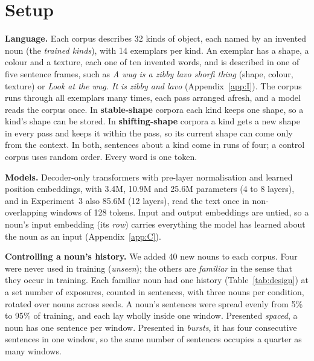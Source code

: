\documentclass[11pt]{article}
\begin{document}
\section{Setup}\label{sec:setup}\label{sec:background}
\textbf{Language.} Each corpus describes 32 kinds of object, each named by an invented noun (the \emph{trained kinds}), with 14 exemplars per kind. An exemplar has a shape, a colour and a texture, each one of ten invented words, and is described in one of five sentence frames, such as \emph{A wug is a zibby lavo shorfi thing} (shape, colour, texture) or \emph{Look at the wug. It is zibby and lavo} (Appendix~\ref{app:I}). The corpus runs through all exemplars many times, each pass arranged afresh, and a model reads the corpus once. In \textbf{stable-shape} corpora each kind keeps one shape, so a kind's shape can be stored. In \textbf{shifting-shape} corpora a kind gets a new shape in every pass and keeps it within the pass, so its current shape can come only from the context. In both, sentences about a kind come in runs of four; a control corpus uses random order. Every word is one token.

\textbf{Models.} Decoder-only transformers with pre-layer normalisation and learned position embeddings, with 3.4M, 10.9M and 25.6M parameters (4 to 8 layers), and in Experiment~3 also 85.6M (12 layers), read the text once in non-overlapping windows of 128 tokens. Input and output embeddings are untied, so a noun's input embedding (its \emph{row}) carries everything the model has learned about the noun as an input (Appendix~\ref{app:C}).

\textbf{Controlling a noun's history.} We added 40 new nouns to each corpus. Four were never used in training (\emph{unseen}); the others are \emph{familiar} in the sense that they occur in training. Each familiar noun had one history (Table~\ref{tab:design}) at a set number of exposures, counted in sentences, with three nouns per condition, rotated over nouns across seeds. A noun's sentences were spread evenly from 5\% to 95\% of training, and each lay wholly inside one window. Presented \emph{spaced}, a noun has one sentence per window. Presented in \emph{bursts}, it has four consecutive sentences in one window, so the same number of sentences occupies a quarter as many windows.
\end{document}

